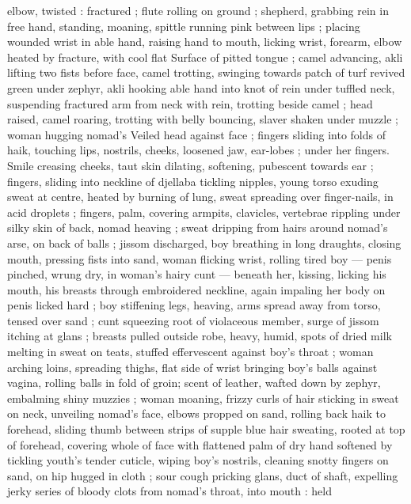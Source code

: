 elbow, twisted : fractured ; flute rolling on ground ; shepherd, 
grabbing rein in free hand, standing, moaning, spittle running pink 
between lips ; placing wounded wrist in able hand, raising hand to 
mouth, licking wrist, forearm, elbow heated by fracture, with cool flat 
Surface of pitted tongue ; camel advancing, akli lifting two fists 
before face, camel trotting, swinging towards patch of turf revived 
green under zephyr, akli hooking able hand into knot of rein under 
tuffled neck, suspending fractured arm from neck with rein, trotting 
beside camel ; head raised, camel roaring, trotting with belly 
bouncing, slaver shaken under muzzle ; woman hugging nomad's 
Veiled head against face ; fingers sliding into folds of haik, touching 
lips, nostrils, cheeks, loosened jaw, ear-lobes ; under her fingers. 
Smile creasing cheeks, taut skin dilating, softening, pubescent 
towards ear ; fingers, sliding into neckline of djellaba tickling 
nipples, young torso exuding sweat at centre, heated by burning of 
lung, sweat spreading over finger-nails, in acid droplets ; fingers, 
palm, covering armpits, clavicles, vertebrae rippling under silky skin 
of back, nomad heaving ; sweat dripping from hairs around nomad's 
arse, on back of balls ; jissom discharged, boy breathing in long 
draughts, closing mouth, pressing fists into sand, woman flicking 
wrist, rolling tired boy --- penis pinched, wrung dry, in woman's hairy 
cunt --- beneath her, kissing, licking his mouth, his breasts through 
embroidered neckline, again impaling her body on penis licked hard 
; boy stiffening legs, heaving, arms spread away from torso, tensed 
over sand ; cunt squeezing root of violaceous member, surge of 
jissom itching at glans ; breasts pulled outside robe, heavy, humid, 
spots of dried milk melting in sweat on teats, stuffed effervescent 
against boy's throat ; woman arching loins, spreading thighs, flat 
side of wrist bringing boy's balls against vagina, rolling balls in fold 
of groin; scent of leather, wafted down by zephyr, embalming shiny 
muzzies ; woman moaning, frizzy curls of hair sticking in sweat on 
neck, unveiling nomad's face, elbows propped on sand, rolling back 
haik to forehead, sliding thumb between strips of supple blue hair 
sweating, rooted at top of forehead, covering whole of face with 
flattened palm of dry hand softened by tickling youth's tender 
cuticle, wiping boy's nostrils, cleaning snotty fingers on sand, on hip 
hugged in cloth ; sour cough pricking glans, duct of shaft, expelling 
jerky series of bloody clots from nomad's throat, into mouth : held 
